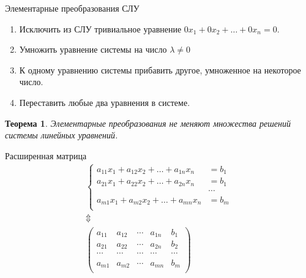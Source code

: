 \documentclass[unicode,11pt,notheorems]{beamer}
\newtheorem{theorem}{Теорема}
\begin{document}
%	
%
\begin{frame}{Элементарные преобразования СЛУ}
\begin{enumerate}
\item 
	Исключить из СЛУ \alert{тривиальное} уравнение  $0x_1+0x_2+\ldots+0x_n=0$.
\item 
	Умножить уравнение системы на число $\lambda \neq 0$
\item 
	К одному уравнению системы прибавить другое, умноженное на некоторое число.
\item 
	Переставить любые два уравнения в системе.
\end{enumerate}
\bigskip
\begin{theorem}
	Элементарные преобразования не меняют множества решений системы линейных уравнений.
\end{theorem}
\end{frame}


\begin{frame}{Расширенная матрица}{}
	\begin{gather*}
	\left\lbrace \begin{aligned}
		a_{11}x_1+ a_{12}x_2+ \ldots+ a_{1n}x_n &= b_1\\
		a_{21}x_1+ a_{22}x_2+ \ldots+ a_{2n}x_n &= b_1\\
		&\cdots\\
		a_{m1}x_1+ a_{m2}x_2+ \ldots+ a_{mn}x_n &= b_m\\
	\end{aligned}
	\right.\\
	\Updownarrow\\
		\left(
		\begin{array}{cccc|c} 
			a_{11} & a_{12} & \cdots & a_{1n} & b_1\\
			a_{21} & a_{22} & \cdots & a_{2n}& b_2\\
			\cdots &\cdots &\cdots &\cdots & \cdots\\
			a_{m1} & a_{m2} & \cdots & a_{mn}& b_m\\
		\end{array}
		\right)
\end{gather*}
\end{frame}
\end{document}
